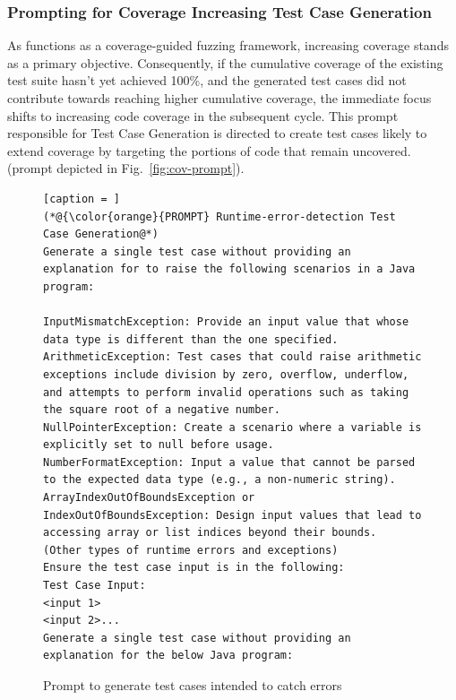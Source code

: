 \subsubsection*{Prompting for Coverage Increasing Test Case Generation}

As {\tool} functions as a coverage-guided fuzzing framework, increasing coverage stands as a primary objective. Consequently, if the cumulative coverage of the existing test suite hasn't yet achieved 100\%, and the generated test cases did not contribute towards reaching higher cumulative coverage, the immediate focus shifts to increasing code coverage in the subsequent cycle. This prompt responsible for Test Case Generation is directed to create test cases likely to extend coverage by targeting the portions of code that remain uncovered. (prompt depicted in Fig.~\ref{fig:cov-prompt}).





\begin{figure}
\hspace{8pt}
\begin{lstlisting}[caption = ]
(*@{\color{orange}{PROMPT} Runtime-error-detection Test Case Generation@*)
Generate a single test case without providing an explanation for to raise the following scenarios in a Java program:

InputMismatchException: Provide an input value that whose data type is different than the one specified. 
ArithmeticException: Test cases that could raise arithmetic exceptions include division by zero, overflow, underflow, and attempts to perform invalid operations such as taking the square root of a negative number.
NullPointerException: Create a scenario where a variable is explicitly set to null before usage.
NumberFormatException: Input a value that cannot be parsed to the expected data type (e.g., a non-numeric string).
ArrayIndexOutOfBoundsException or IndexOutOfBoundsException: Design input values that lead to accessing array or list indices beyond their bounds.
(Other types of runtime errors and exceptions)
Ensure the test case input is in the following:
Test Case Input:
<input 1>
<input 2>...
Generate a single test case without providing an explanation for the below Java program:
\end{lstlisting}
\vspace{-12pt}
\caption{Prompt to generate test cases intended to catch errors}
\label{fig:exception-prompt}
\end{figure}


